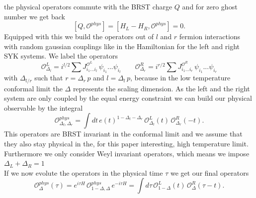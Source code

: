 \documentclass{article}
\numberwithin{equation}{section}
\begin{document}
the physical operators commute with the BRST charge $Q$ and for zero ghost number we get back
\begin{equation}
    \left[ Q, \mathcal{O}^{phys} \right] = \left[ H_L - H_R, \mathcal{O}^{phys} \right] = 0.
\end{equation}
Equipped with this we build the operators out of $l$ and $r$ fermion interactions with random gaussian couplings like in the Hamiltonian for the left and right SYK systems. We label the operators
\begin{equation}
    \mathcal{O}^L_{\Delta_l} = i^{l/2} \sum J^{\mathcal{O}^L}_{i_1...i_l} \, \psi_{i_1}...\psi_{i_l} \qquad \mathcal{O}^R_{\Delta_r} = i^{r/2} \sum J^{\mathcal{O}^R}_{i_1...i_r} \, \psi_{i_1}...\psi_{i_r}
\end{equation}
with $\Delta_{l/r}$ such that $r = \Delta_r \, p$ and $l = \Delta_l \, p$, because in the low temperature conformal limit the $\Delta$ represents the scaling dimension. As the left and the right system are only coupled by the equal energy constraint we can build our physical observable by the integral 
\begin{equation}
    \mathcal{O}^{phys}_{\Delta_l, \Delta_r} = \int dt \, e(t)^{1- \Delta_l - \Delta_r} \,
    \mathcal{O}^L_{\Delta_l}(t) \, \mathcal{O}^R_{\Delta_r}(-t).
\end{equation}
This operators are BRST invariant in the conformal limit and we assume that they also stay physical in the, for this paper interesting, high temperature limit. Furthermore we only consider Weyl invariant operators, which means we impose $ \Delta_L + \Delta_R = 1$ \\
If we now evolute the operators in the physical time $\tau$ we get our final operators 
\begin{equation}
    \mathcal{O}^{phys}_{\Delta}(\tau) = e^{i \tau H} \, \mathcal{O}^{phys}_{1-\Delta, \Delta} \, e^{-i \tau H} =\int d\tau  \,
    \mathcal{O}^L_{1-\Delta}(t) \, \mathcal{O}^R_{\Delta}(\tau-t).
\end{equation}
\end{document}
